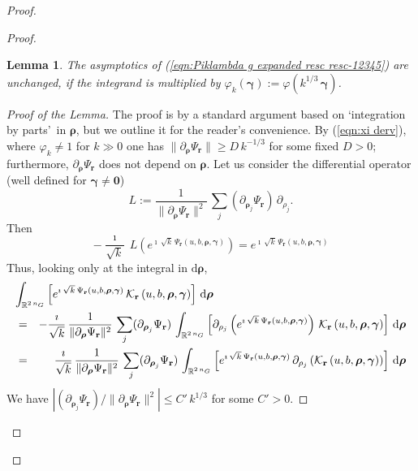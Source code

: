 \documentclass[12pt,a4paper]{article}
\theoremstyle{plain}
\newtheorem{lem}[thm]{Lemma}%
\theoremstyle{definition}
\begin{document}
\begin{proof}
\begin{proof}
\begin{lem}
The asymptotics of (\ref{eqn:Piklambda g expanded resc resc-12345}) are unchanged, if the integrand is 
multiplied by $\varphi_k(\boldsymbol{\gamma}):=
\varphi\left(k^{1/3}\,\boldsymbol{\gamma}  \right)$.
\end{lem}

\begin{proof}[Proof of the Lemma]
The proof is by a standard argument based on 
\lq integration by parts\rq\, 
in $\boldsymbol{\rho}$, but we outline it 
for the reader's convenience.
By (\ref{eqn:xi derv}), where $\varphi_k\neq 1$ 
for $k\gg 0$ one has
$\|\partial_{\boldsymbol{\rho}}
\Psi_{\mathbf{r}}\|\ge D\,k^{-1/3}$ for some fixed $D>0$;
furthermore, $\partial_{\boldsymbol{\rho}}
\Psi_{\mathbf{r}}$ does not depend on $\boldsymbol{\rho}$.
Let us consider the differential operator (well defined for
$\boldsymbol{\gamma}\neq \mathbf{0}$)
$$
L:=\frac{1}{\|\partial_{\boldsymbol{\rho}}
\Psi_{\mathbf{r}}\|^2}\,
\sum_j (\partial_{\boldsymbol{\rho}_j}
\Psi_{\mathbf{r}})\,\partial_{\rho_j}.
$$
Then
%
$$
-\frac{\imath}{\sqrt{k}}\,
L\left(e^{\imath\,\sqrt{k}\,
\Psi_{\mathbf{r}}
\left(u,b,\boldsymbol{\rho},
\boldsymbol{\gamma} \right)}\right)=
 e^{\imath\,\sqrt{k}\,
\Psi_{\mathbf{r}}
\left(u,b,\boldsymbol{\rho},
\boldsymbol{\gamma} \right)}
$$
Thus, looking only at the integral in $\mathrm{d}\boldsymbol{\rho}$,
\begin{eqnarray}
\label{eqn:int by part rho}
\lefteqn{\int_{\mathbb{R}^{2\,n_G}}
%
\left[
 e^{\imath\,\sqrt{k}\,
\Psi_{\mathbf{r}}
\left(u,b,\boldsymbol{\rho},
\boldsymbol{\gamma} \right)}\,
\mathcal{K}_{\mathbf{r}}\left(u,b,\boldsymbol{\rho},
\boldsymbol{\gamma} \right)\right]\,\mathrm{d}
\boldsymbol{\rho}  }\\
&=&-\frac{\imath}{\sqrt{k}}\,
\frac{1}{\|\partial_{\boldsymbol{\rho}}
\Psi_{\mathbf{r}}\|^2}\,
\sum_j (\partial_{\boldsymbol{\rho}_j}
\Psi_{\mathbf{r}})\,
\int_{\mathbb{R}^{2\,n_G}}
%
\left[\partial_{\rho_j}\left(
 e^{\imath\,\sqrt{k}\,
\Psi_{\mathbf{r}}
\left(u,b,\boldsymbol{\rho},
\boldsymbol{\gamma} \right)}\right)\,
\mathcal{K}_{\mathbf{r}}\left(u,b,\boldsymbol{\rho},
\boldsymbol{\gamma} \right)\right]\,\mathrm{d}
\boldsymbol{\rho}\nonumber\\
&=&\frac{\imath}{\sqrt{k}}\,
\frac{1}{\|\partial_{\boldsymbol{\rho}}
\Psi_{\mathbf{r}}\|^2}\,
\sum_j (\partial_{\boldsymbol{\rho}_j}
\Psi_{\mathbf{r}})\,
\int_{\mathbb{R}^{2\,n_G}}
%
\left[
 e^{\imath\,\sqrt{k}\,
\Psi_{\mathbf{r}}
\left(u,b,\boldsymbol{\rho},
\boldsymbol{\gamma} \right)}\,
\partial_{\rho_j}\left(\mathcal{K}_{\mathbf{r}}\left(u,b,\boldsymbol{\rho},
\boldsymbol{\gamma} \right)\right)\right]\,\mathrm{d}
\boldsymbol{\rho}\nonumber
\end{eqnarray}
We have $\left|(\partial_{\boldsymbol{\rho}_j}
\Psi_{\mathbf{r}})/\|\partial_{\boldsymbol{\rho}}
\Psi_{\mathbf{r}}\|^2\right|\le C'\,k^{1/3}$ for some
$C'>0$.


\end{proof}
\end{proof}
\end{proof}
\end{document}
